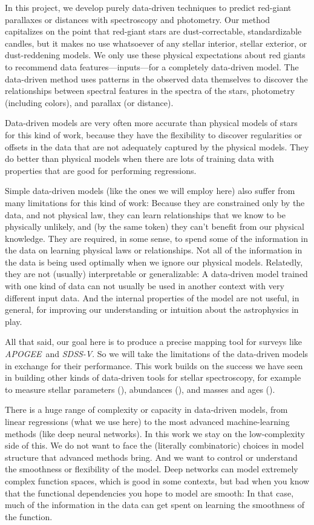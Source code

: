 \documentclass[modern]{aastex62}
\newcommand{\acronym}[1]{{\small{#1}}}
\newcommand{\project}[1]{\textsl{#1}}
\newcommand{\apogee}{\project{\acronym{APOGEE}}}
\newcommand{\sdssv}{\project{\acronym{SDSS-V}}}
\begin{document}
In this project, we develop purely data-driven techniques to predict
red-giant parallaxes or distances with spectroscopy and photometry.
Our method capitalizes on the point that red-giant stars are dust-correctable,
standardizable candles, but it makes no use whatsoever of any stellar interior,
stellar exterior, or dust-reddening models.
We only use these physical expectations about red giants to recommend
data features---inputs---for a completely data-driven model.
The data-driven method uses patterns in the observed data themselves
to discover the relationships between spectral features in the spectra of the stars,
photometry (including colors), and parallax (or distance).

Data-driven models are very often more accurate than physical models of stars
for this kind of work, because they have the flexibility to discover
regularities or offsets in the data that are not adequately captured by the physical
models.
They do better than physical models when there are lots of training data
with properties that are good for performing regressions.

Simple data-driven models (like the ones we will employ here)
also suffer from many limitations for this kind of work:
Because they are constrained only by the data, and not physical law,
they can learn relationships that we know
to be physically unlikely, and (by the same token) they can't benefit from our
physical knowledge.
They are required, in some sense, to spend some of the information in the data on
learning physical laws or relationships.
Not all of the information in the data is being used
optimally when we ignore our physical models.
Relatedly, they are not (usually) interpretable or generalizable:
A data-driven model trained with one kind of data can not usually be used in another
context with very different input data.
And the internal properties of the model are not useful, in general, for improving
our understanding or intuition about the astrophysics in play.

All that said, our goal here is to produce a precise mapping tool for surveys
like \apogee\ and \sdssv.
So we will take the limitations of the data-driven models in exchange for their
performance.
This work builds on the success we have seen in building other kinds of
data-driven tools for  stellar spectroscopy, for example to measure stellar
parameters (\citealt{cannon}), abundances (\citealt{ho, casey, nessdopp}),
and masses and ages (\citealt{nessage}).

There is a huge range of complexity or capacity in data-driven
models, from linear regressions (what we use here) to the most advanced machine-learning
methods (like deep neural networks).
In this work we stay on the low-complexity side of this.
We do not want to face the (literally combinatoric) choices in model structure that
advanced methods bring.
And we want to control or understand the smoothness or flexibility of the model.
Deep networks can model extremely complex function spaces, which is good in some
contexts, but bad when you know that the functional dependencies you hope to
model are smooth:
In that case, much of the information in the data can get spent on learning the
smoothness of the function.
\end{document}
